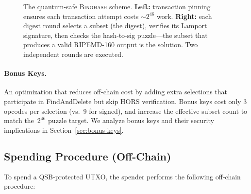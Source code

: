 \documentclass[11pt, a4paper]{article}
\begin{document}
\begin{figure}[H]
\caption{The quantum-safe \textsc{Binohash} scheme. \textbf{Left:} transaction pinning ensures each transaction attempt costs ${\sim}2^{46}$ work. \textbf{Right:} each digest round selects a subset (the digest), verifies its Lamport signature, then checks the hash-to-sig puzzle---the subset that produces a valid RIPEMD-160 output is the solution. Two independent rounds are executed.}
\label{fig:qs-scheme}
\end{figure}

\paragraph{Bonus Keys.}
An optimization that reduces off-chain cost by adding extra selections that participate in FindAndDelete but skip HORS verification. Bonus keys cost only 3 opcodes per selection (vs.\ 9 for signed), and increase the effective subset count to match the~$2^{46}$ puzzle target. We analyze bonus keys and their security implications in Section~\ref{sec:bonus-keys}.

\subsection{Spending Procedure (Off-Chain)}
\label{sec:spending-procedure}

To spend a QSB-protected UTXO, the spender performs the following off-chain procedure:
\end{document}
